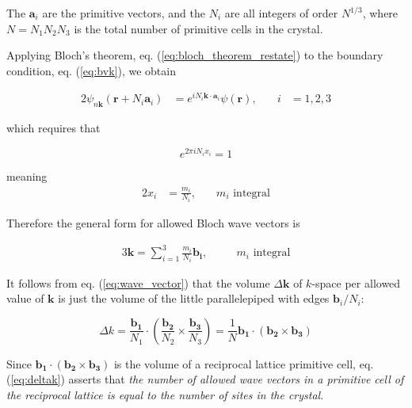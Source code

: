 	The $\mathbf{a}_i$ are the primitive vectors, and the $N_i$ are all integers of order $N^{1/3}$, where $N=N_1N_2N_3$ is the total number of primitive cells in the crystal.

	Applying Bloch's theorem, eq. (\ref{eq:bloch_theorem_restate}) to the boundary condition, eq. (\ref{eq:bvk}),  we obtain

	\begin{alignat}{2}\label{eq:bloch_applied}
		\psi_{n\mathbf{k}}
		(\mathbf{r} + N_i \mathbf{a}_i)
		&= 
		e^{i N_i \mathbf{k} \cdot \mathbf{a}_i}
		\psi(\mathbf{r}),
		&\quad
		i &= 1,2,3
	\end{alignat}

	which requires that

	\begin{equation} \label{eq:requirement}
		e^{2 \pi i N_i x_i} = 1
	\end{equation}

	meaning
	\begin{alignat}{2} \label{eq:xi}
		x_i &= \frac{m_i}{N_i},
		& \quad
		m_i\text{ integral}
	\end{alignat}


	Therefore the general form for allowed Bloch wave vectors is

	\begin{alignat}{3} \label{eq:wave_vector}
		\mathbf{k} =
		\sum_{i=1}^{3} \frac{m_i}{N_i}
		\mathbf{b_i}
		,
		&\quad 
		&m_i\text{ integral}
	\end{alignat}

	It follows from eq. (\ref{eq:wave_vector}) that the volume $\Delta\mathbf{k}$ of $k$-space per allowed value of $\mathbf{k}$ is just the volume of the little parallelepiped with edges $\mathbf{b}_i/N_i$:

	\begin{equation} \label{eq:deltak}
		\Delta{k}
		= 
		\frac{\mathbf{b_1}}{N_1}
		\cdot
		\left(
		\frac{\mathbf{b_2}}{N_2}
		\times
		\frac{\mathbf{b_3}}{N_3}
		\right)
		=
		\frac{1}{N}
		\mathbf{b_1}
		\cdot
		\left(
		\mathbf{b_2}
		\times
		\mathbf{b_3}
		\right)
	\end{equation}

	Since $\mathbf{b_1} \cdot (\mathbf{b_2} \times \mathbf{b_3})$ is the volume of a reciprocal lattice primitive cell, eq. (\ref{eq:deltak}) asserts that \emph{the number of allowed wave vectors in a primitive cell of the reciprocal lattice is equal to the number of sites in the crystal}.


